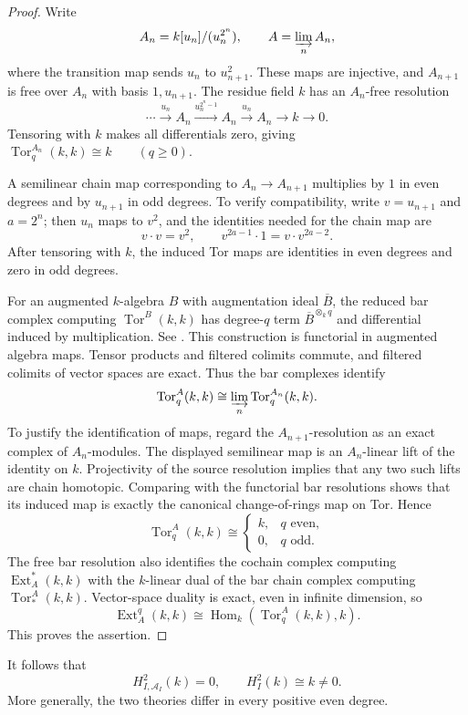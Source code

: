 \documentclass[11pt,reqno]{amsart}
\theoremstyle{definition}
\theoremstyle{remark}
\newcommand{\Hom}{\operatorname{Hom}}
\newcommand{\Ext}{\operatorname{Ext}}
\newcommand{\Tor}{\operatorname{Tor}}
\newcommand{\A}{\mathcal A_I}
\begin{document}
\begin{proof}
Write
\[
A_n=k[u_n]/(u_n^{2^n}),
\qquad
A=\varinjlim_n A_n,
\]
where the transition map sends $u_n$ to $u_{n+1}^2$. These maps are injective, and $A_{n+1}$ is free over $A_n$ with basis $1,u_{n+1}$. The residue field $k$ has an $A_n$-free resolution
\[
\cdots
\xrightarrow{u_n}A_n
\xrightarrow{u_n^{2^n-1}}A_n
\xrightarrow{u_n}A_n
\longrightarrow k\longrightarrow 0.
\]
Tensoring with $k$ makes all differentials zero, giving
\(\Tor_q^{A_n}(k,k)\cong k
\qquad(q\geq 0).\)

A semilinear chain map corresponding to $A_n\to A_{n+1}$
multiplies by $1$ in even degrees and by $u_{n+1}$
in odd degrees. To verify compatibility, write
$v=u_{n+1}$ and $a=2^n$; then $u_n$ maps to $v^2$,
and the identities needed for the chain map are
\[
v\cdot v=v^2,
\qquad
v^{2a-1}\cdot 1=v\cdot v^{2a-2}.
\]
After tensoring with $k$, the induced Tor maps are
identities in even degrees and zero in odd degrees.

For an augmented $k$-algebra $B$ with augmentation ideal $\overline B$, the reduced bar complex computing $\Tor^B(k,k)$ has degree-$q$ term $\overline B^{\otimes_k q}$ and differential induced by multiplication. See \cite[Chapter~8]{Weibel1994}. This construction is functorial in augmented algebra maps. Tensor products and filtered colimits commute, and filtered colimits of vector spaces are exact. Thus the bar complexes identify
\[
\Tor_q^A(k,k)\cong\varinjlim_n\Tor_q^{A_n}(k,k).
\]
To justify the identification of maps, regard the $A_{n+1}$-resolution as an exact complex of $A_n$-modules. The displayed semilinear map is an $A_n$-linear lift of the identity on $k$. Projectivity of the source resolution implies that any two such lifts are chain homotopic. Comparing with the functorial bar resolutions shows that its induced map is exactly the canonical change-of-rings map on Tor. Hence
\[
\Tor_q^A(k,k)\cong
\begin{cases}k,&q\text{ even},\\0,&q\text{ odd}.\end{cases}
\]
The free bar resolution also identifies the cochain complex computing $\Ext_A^*(k,k)$ with the $k$-linear dual of the bar chain complex computing $\Tor_*^A(k,k)$. Vector-space duality is exact, even in infinite dimension, so
\[
\Ext_A^q(k,k)\cong\Hom_k(\Tor_q^A(k,k),k).
\]
This proves the assertion.
\end{proof}

It follows that
\[H^2_{I,\A}(k)=0,\qquad H_I^2(k)\cong k\neq 0.\]
More generally, the two theories differ in every
positive even degree.
\end{document}
